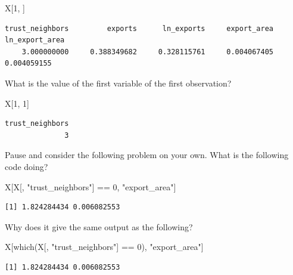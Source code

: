 \documentclass[
  letterpaper,
]{book}
\newenvironment{Shaded}{\begin{snugshade}}{\end{snugshade}}
\newcommand{\DecValTok}[1]{\textcolor[rgb]{0.68,0.00,0.00}{#1}}
\newcommand{\FunctionTok}[1]{\textcolor[rgb]{0.28,0.35,0.67}{#1}}
\newcommand{\NormalTok}[1]{\textcolor[rgb]{0.00,0.23,0.31}{#1}}
\newcommand{\SpecialCharTok}[1]{\textcolor[rgb]{0.37,0.37,0.37}{#1}}
\newcommand{\StringTok}[1]{\textcolor[rgb]{0.13,0.47,0.30}{#1}}
\theoremstyle{definition}
\theoremstyle{definition}
\theoremstyle{plain}
\theoremstyle{definition}
\theoremstyle{plain}
\theoremstyle{plain}
\theoremstyle{remark}
\begin{document}
\begin{Shaded}
\begin{Highlighting}[]
\NormalTok{X[}\DecValTok{1}\NormalTok{, ]}
\end{Highlighting}
\end{Shaded}

\begin{verbatim}
trust_neighbors         exports      ln_exports     export_area  ln_export_area 
    3.000000000     0.388349682     0.328115761     0.004067405     0.004059155 
\end{verbatim}

What is the value of the first variable of the first observation?

\begin{Shaded}
\begin{Highlighting}[]
\NormalTok{X[}\DecValTok{1}\NormalTok{, }\DecValTok{1}\NormalTok{]}
\end{Highlighting}
\end{Shaded}

\begin{verbatim}
trust_neighbors 
              3 
\end{verbatim}

Pause and consider the following problem on your own. What is the
following code doing?

\begin{Shaded}
\begin{Highlighting}[]
\NormalTok{X[X[, }\StringTok{"trust\_neighbors"}\NormalTok{] }\SpecialCharTok{==} \DecValTok{0}\NormalTok{, }\StringTok{"export\_area"}\NormalTok{]}
\end{Highlighting}
\end{Shaded}

\begin{verbatim}
[1] 1.824284434 0.006082553
\end{verbatim}

Why does it give the same output as the following?

\begin{Shaded}
\begin{Highlighting}[]
\NormalTok{X[}\FunctionTok{which}\NormalTok{(X[, }\StringTok{"trust\_neighbors"}\NormalTok{] }\SpecialCharTok{==} \DecValTok{0}\NormalTok{), }\StringTok{"export\_area"}\NormalTok{]}
\end{Highlighting}
\end{Shaded}

\begin{verbatim}
[1] 1.824284434 0.006082553
\end{verbatim}
\end{document}
